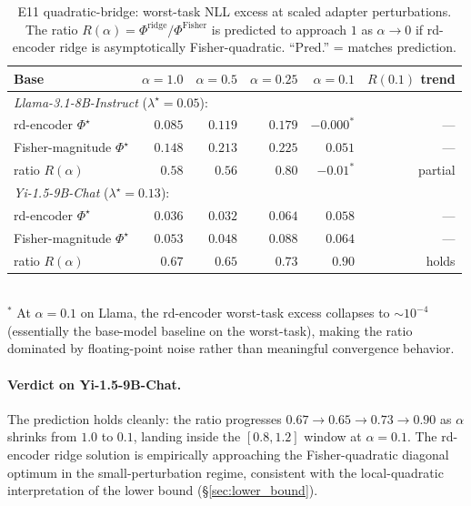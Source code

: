 \begin{table}[t]
\centering
\caption{E11 quadratic-bridge: worst-task NLL excess at scaled
adapter perturbations. The ratio $R(\alpha) =
\Phi^{\mathrm{ridge}} / \Phi^{\mathrm{Fisher}}$ is predicted to
approach $1$ as $\alpha \to 0$ if rd-encoder ridge is asymptotically
Fisher-quadratic. ``Pred.'' = matches prediction.}
\label{tab:e11-quadbridge}
\begin{tabular}{lrrrr|r}
\hline
Base & $\alpha=1.0$ & $\alpha=0.5$ & $\alpha=0.25$ & $\alpha=0.1$ & $R(0.1)$ trend \\
\hline
\multicolumn{6}{l}{\textit{Llama-3.1-8B-Instruct} ($\lambda^\star = 0.05$):} \\
\quad rd-encoder $\Phi^\star$  & $0.085$ & $0.119$ & $0.179$ & $-0.000^*$ & --- \\
\quad Fisher-magnitude $\Phi^\star$       & $0.148$ & $0.213$ & $0.225$ & $0.051$  & --- \\
\quad ratio $R(\alpha)$                   & $0.58$  & $0.56$  & $0.80$  & $-0.01^*$ & partial \\
\hline
\multicolumn{6}{l}{\textit{Yi-1.5-9B-Chat} ($\lambda^\star = 0.13$):} \\
\quad rd-encoder $\Phi^\star$  & $0.036$ & $0.032$ & $0.064$ & $0.058$  & --- \\
\quad Fisher-magnitude $\Phi^\star$       & $0.053$ & $0.048$ & $0.088$ & $0.064$  & --- \\
\quad ratio $R(\alpha)$                   & $0.67$  & $0.65$  & $0.73$  & $\mathbf{0.90}$ & holds \\
\hline
\end{tabular}
\\
\small
$^*$ At $\alpha = 0.1$ on Llama, the rd-encoder worst-task excess
collapses to $\sim 10^{-4}$ (essentially the base-model baseline on
the worst-task), making the ratio dominated by floating-point
noise rather than meaningful convergence behavior.
\end{table}

\paragraph{Verdict on Yi-1.5-9B-Chat.}
The prediction holds cleanly: the ratio progresses $0.67 \to 0.65 \to
0.73 \to 0.90$ as $\alpha$ shrinks from $1.0$ to $0.1$, landing
inside the $[0.8, 1.2]$ window at $\alpha = 0.1$. The rd-encoder
ridge solution is empirically approaching the Fisher-quadratic
diagonal optimum in the small-perturbation regime, consistent with
the local-quadratic interpretation of the lower bound
(\S\ref{sec:lower_bound}).

